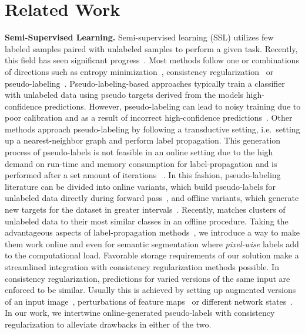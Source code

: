 \documentclass[letterpaper]{article} %
\begin{document}
\section{Related Work}
\noindent\textbf{Semi-Supervised Learning.} Semi-supervised learning (SSL) utilizes few labeled samples paired with unlabeled samples to perform a given task.
Recently, this field has seen significant progress~\cite{berthelot2019mixmatch,berthelot2019remixmatch,cascante2020curriculum,ouali2020semi,chen2020big,sohn2020fixmatch,pham2021meta}. Most methods follow one or combinations of directions such as entropy minimization~\cite{grandvalet2005semi}, consistency regularization~\cite{tarvainen2017mean,ji2019invariant,sohn2020fixmatch} or pseudo-labeling~\cite{lee2013pseudo,iscen2019label,cascante2020curriculum}. Pseudo-labeling-based approaches typically train a classifier with unlabeled data using pseudo targets derived from the models high-confidence predictions\cite{lee2013pseudo}. However, pseudo-labeling can lead to noisy training due to poor calibration and as a result of incorrect high-confidence predictions~\cite{guo2017calibration,rizve2021defense}. Other methods approach pseudo-labeling by following a transductive setting, i.e.~setting up a nearest-neighbor graph and perform label propagation. This generation process of pseudo-labels is not feasible in an online setting due to the high demand on run-time and memory consumption for label-propagation and is performed after a set amount of iterations  ~\cite{shi2018transductive,iscen2019label,liu2019deep}.
In this fashion, pseudo-labeling literature can be divided into online variants, which build pseudo-labels for unlabeled data directly during forward pass~\cite{lee2013pseudo,sohn2020fixmatch}, and offline variants, which generate new targets for the dataset in greater intervals~\cite{iscen2019label,chen2020big, xie2020self,cascante2020curriculum, pham2021meta}. Recently, \cite{taherkhani2021self} matches clusters of unlabeled data to their most similar classes in an offline procedure.
Taking the advantageous aspects of label-propagation methods~\cite{shi2018transductive,iscen2019label,liu2019deep}, we introduce a way to make them work online and even for semantic segmentation where \emph{pixel-wise} labels add to the computational load.
Favorable storage requirements of our solution make a streamlined integration with consistency regularization methods possible.
In consistency regularization, predictions for varied versions of the same input are enforced to be similar.
Usually this is achieved by setting up augmented versions of an input image~\cite{sohn2020fixmatch}, perturbations of feature maps~\cite{ouali2020semi} or different network states~\cite{tarvainen2017mean}.
In our work, we intertwine online-generated pseudo-labels with consistency regularization to alleviate drawbacks in either of the two.
\end{document}

